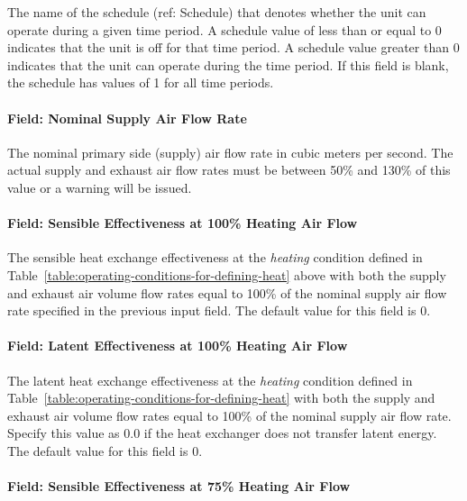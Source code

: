 The name of the schedule (ref: Schedule) that denotes whether the unit can operate during a given time period. A schedule value of less than or equal to 0 indicates that the unit is off for that time period. A schedule value greater than 0 indicates that the unit can operate during the time period. If this field is blank, the schedule has values of 1 for all time periods.

\paragraph{Field: Nominal Supply Air Flow Rate}\label{field-nominal-supply-air-flow-rate-1}

The nominal primary side (supply) air flow rate in cubic meters per second. The actual supply and exhaust air flow rates must be between 50\% and 130\% of this value or a warning will be issued.

\paragraph{Field: Sensible Effectiveness at 100\% Heating Air Flow}\label{field-sensible-effectiveness-at-100-heating-air-flow}

The sensible heat exchange effectiveness at the \emph{heating} condition defined in Table~\ref{table:operating-conditions-for-defining-heat} above with both the supply and exhaust air volume flow rates equal to 100\% of the nominal supply air flow rate specified in the previous input field. The default value for this field is 0.

\paragraph{Field: Latent Effectiveness at 100\% Heating Air Flow}\label{field-latent-effectiveness-at-100-heating-air-flow}

The latent heat exchange effectiveness at the \emph{heating} condition defined in Table~\ref{table:operating-conditions-for-defining-heat} with both the supply and exhaust air volume flow rates equal to 100\% of the nominal supply air flow rate. Specify this value as 0.0 if the heat exchanger does not transfer latent energy. The default value for this field is 0.

\paragraph{Field: Sensible Effectiveness at 75\% Heating Air Flow}\label{field-sensible-effectiveness-at-75-heating-air-flow}

